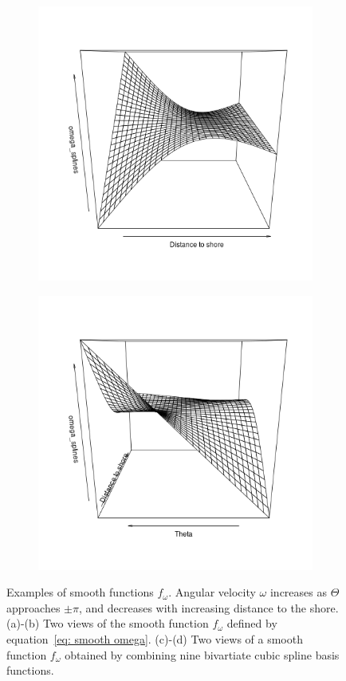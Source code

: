 \documentclass[11pt]{article}
\newcommand {\1}{\mathbb{1}}
\theoremstyle{definition}
\theoremstyle{remark}
\theoremstyle{remark}
\begin{document}
\begin{figure}[H]
	\begin{subfigure}{0.48\textwidth}
	\centering
	\includegraphics[scale=0.3]{images/crcvm/smooth_splines_omega1.png}
	\caption{}
	\label{fig: smoothomegasplines1}
	\end{subfigure}
	\begin{subfigure}{0.48\textwidth}
	\centering
	\includegraphics[scale=0.3]{images/crcvm/smooth_splines_omega2.png}
	\caption{}
	\label{fig: smoothomegasplines2}
	\end{subfigure}
	\caption{Examples of smooth functions $f_{\omega}$. Angular velocity $\omega$ increases as $\Theta$ approaches $\pm\pi$, and decreases with increasing distance to the shore. (a)-(b) Two views of the smooth function $f_{\omega}$ defined by equation~\ref{eq: smooth omega}. (c)-(d) Two views of a smooth function $f_{\omega}$ obtained by combining nine bivartiate cubic spline basis functions.}
	
\end{figure}
\end{document}
